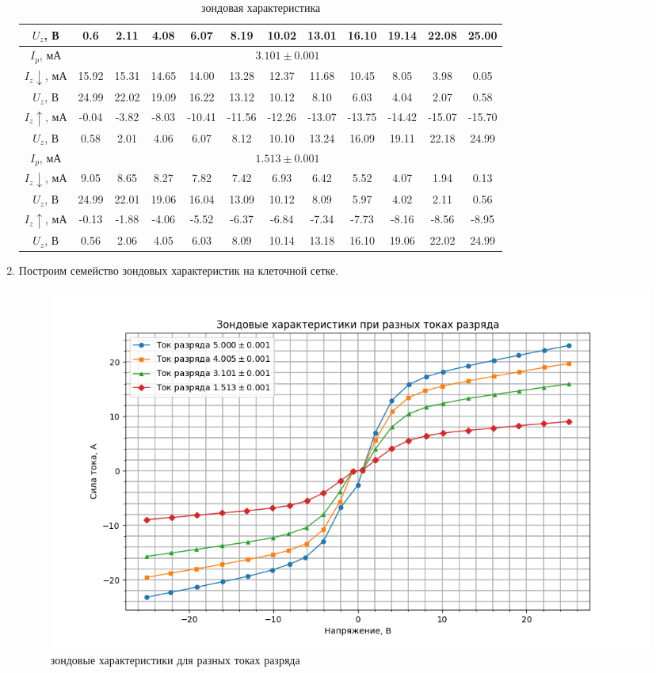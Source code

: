 \documentclass[a4paper, 12pt]{article}
\begin{document}
\begin{enumerate}
\begin{table}[htbp]
\begin{tabular}{|c|c|c|c|c|c|c|c|c|c|c|c|}
            $U_{z}$, В & 0.6 & 2.11 & 4.08 & 6.07 & 8.19 & 10.02 & 13.01 & 16.10 & 19.14 & 22.08 & 25.00\\ \hline
            $I_{p}$, мА & \multicolumn{11}{|c|}{$3.101\pm 0.001$}\\ \hline
            $I_{z}\downarrow$, мА & 15.92 & 15.31 & 14.65 & 14.00 & 13.28 & 12.37 & 11.68 & 10.45 & 8.05 & 3.98 & 0.05\\ \hline
            $U_{z}$, В & 24.99 & 22.02 & 19.09 & 16.22 & 13.12 & 10.12 & 8.10 & 6.03 & 4.04 & 2.07 & 0.58\\ \hline
            $I_{z}\uparrow$, мА & -0.04 & -3.82 & -8.03 & -10.41 & -11.56 & -12.26 & -13.07 & -13.75 & -14.42 & -15.07 & -15.70\\ \hline
            $U_{z}$, В & 0.58 & 2.01 & 4.06 & 6.07 & 8.12 & 10.10 & 13.24 & 16.09 & 19.11 & 22.18 & 24.99\\ \hline
            $I_{p}$, мА & \multicolumn{11}{|c|}{$1.513\pm 0.001$}\\ \hline
            $I_{z}\downarrow$, мА & 9.05 & 8.65 & 8.27 & 7.82 & 7.42 & 6.93 & 6.42 & 5.52 & 4.07 & 1.94 & 0.13\\ \hline
            $U_{z}$, В & 24.99 & 22.01 & 19.06 & 16.04 & 13.09 & 10.12 & 8.09 & 5.97 & 4.02 & 2.11 & 0.56\\ \hline
            $I_{z}\uparrow$, мА & -0.13 & -1.88 & -4.06 & -5.52 & -6.37 & -6.84 & -7.34 & -7.73 & -8.16 & -8.56 & -8.95\\ \hline
            $U_{z}$, В & 0.56 & 2.06 & 4.05 & 6.03 & 8.09 & 10.14 & 13.18 & 16.10 & 19.06 & 22.02 & 24.99\\ \hline
        \end{tabular}
        \caption{зондовая характеристика}
    \end{table}
    \item Построим семейство зондовых характеристик на клеточной сетке.
    \begin{figure}[H]
        \centering
        \includegraphics[width=0.9\linewidth]{zond.png}
        \caption{зондовые характеристики для разных токах разряда}
        \label{зондовые характеристики для разных токах разряда}
    \end{figure}
\end{enumerate}
\end{document}

